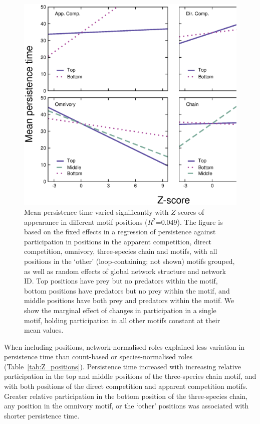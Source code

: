 \documentclass[12pt]{article}
\begin{document}
\begin{spacing}{2.0}
        \begin{figure}[ht!]
            \centering
            \includegraphics[width=.75\textwidth]{figures/roles/persistence_vs_positions_Z.eps}
            \caption{Mean persistence time varied significantly with $Z$-scores of appearance in different motif positions ($R^2$=0.049). The figure is based on the fixed effects in a regression of persistence against participation in positions in the apparent competition, direct competition, omnivory, three-species chain and motifs, with all positions in the `other' (loop-containing; not shown) motifs grouped, as well as random effects of global network structure and network ID. Top positions have prey but no predators within the motif, bottom positions have predators but no prey within the motif, and middle positions have both prey and predators within the motif. We show the marginal effect of changes in participation in a single motif, holding participation in all other motifs constant at their mean values.}
            \label{fig:persistence_positions_Z}
        \end{figure}

        When including positions, network-normalised roles explained less variation in persistence time than count-based or species-normalised roles (Table~\ref{tab:Z_positions}).
        Persistence time increased with increasing relative participation in the top and middle positions of the three-species chain motif, and with both positions of the direct competition and apparent competition motifs.
        Greater relative participation in the bottom position of the three-species chain, any position in the omnivory motif, or the `other' positions was associated with shorter persistence time.
        


\end{spacing}
\end{document}
